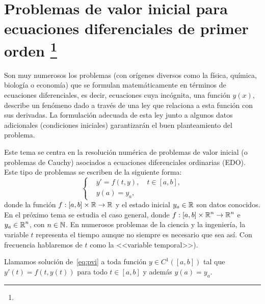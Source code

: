 \renewcommand{\tt}{t}
\newcommand{\yy}{y}
\newcommand{\ta}{a}
\newcommand{\tb}{b}
\newcommand{\ycero}{y_a}
\newcommand{\ee}{e\xspace}
\newcommand{\sol}{y}
\newcommand{\lischiptz}{$y$--Lischiptz\xspace}
\newcommand{\locLischiptz}{localmente $y$--Lischiptz\xspace}

\chapter[Problemas de valor inicial para EDOs de primer orden]
{Problemas de valor inicial para ecuaciones diferenciales de primer
  orden%
  \footnote{\licenseInfo}}

Son muy numerosos los problemas (con orígenes diversos como la física,
química, biología o economía) que se formulan matemáticamente en
términos de ecuaciones diferenciales, es decir, ecuaciones cuya
incógnita, una función $y(x)$, describe un fenómeno dado a través de
una ley que relaciona a esta función con sus derivadas. La formulación
adecuada de esta ley junto a algunos datos adicionales (condiciones
iniciales) garantizarán el buen planteamiento del problema.

Este tema se centra en la resolución numérica de problemas de valor
inicial (o problemas de Cauchy) asociados a ecuaciones diferenciales
ordinarias (EDO). Este tipo de problemas se escriben de la siguiente
forma:
\begin{equation}
  \label{eq:pvi}
  \tag{PVI}
  \left\{
  \begin{aligned}
    &y' = f(\tt,\yy), \quad \tt\in[\ta,\tb],
    \\
    &y(\ta) = \ycero,
  \end{aligned}
  \right.
\end{equation}
donde la función $f:[\ta,\tb]\times\Rset\to\Rset$ y el estado inicial
$\ycero\in\Rset$ son datos conocidos. En el próximo tema se estudia el
caso general, donde $f:[\ta,\tb]\times\Rset^n\to\Rset^n$ \ee
$\ycero\in\Rset^n$, con $n\in\operatorname{{\mathbb N}}$. En numerosos problemas de la
ciencia y la ingeniería, la variable $\tt$ representa el tiempo aunque
no siempre es necesario que sea así. Con frecuencia
hablaremos de $\tt$ como la <<variable temporal>>).

\begin{definition}
  Llamamos solución de~\eqref{eq:pvi} a toda función $\sol\in
  C^1([\ta,\tb])$ tal que $\sol'(\tt)=f(\tt,\sol(\tt))$ para todo
  $\tt\in[\ta,\tb]$ y además $\sol(\ta)=\ycero$.\label{def:3}
\end{definition}

